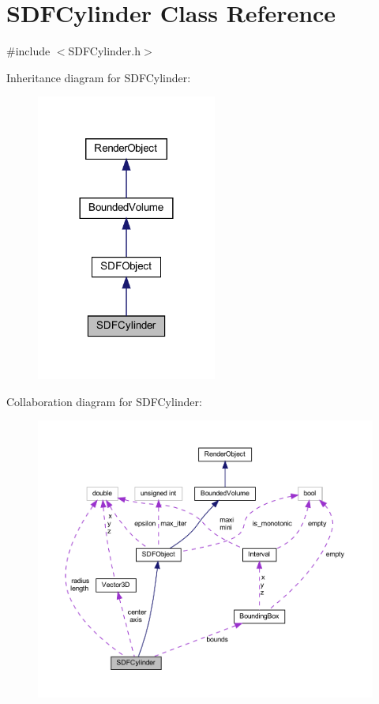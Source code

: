 \hypertarget{classSDFCylinder}{}\section{S\+D\+F\+Cylinder Class Reference}
\label{classSDFCylinder}


{\ttfamily \#include $<$S\+D\+F\+Cylinder.\+h$>$}



Inheritance diagram for S\+D\+F\+Cylinder\+:
\nopagebreak
\begin{figure}[H]
\begin{center}
\leavevmode
\includegraphics[width=168pt]{classSDFCylinder__inherit__graph}
\end{center}
\end{figure}


Collaboration diagram for S\+D\+F\+Cylinder\+:
\nopagebreak
\begin{figure}[H]
\begin{center}
\leavevmode
\includegraphics[width=350pt]{classSDFCylinder__coll__graph}
\end{center}
\end{figure}
